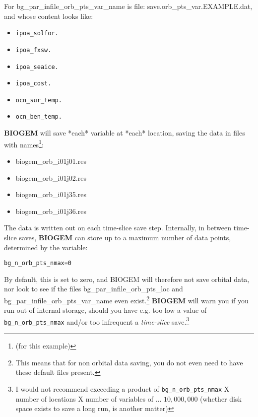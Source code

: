 \documentclass[11pt,fleqn]{book} %
\begin{document}
For \footnotesize\textsf{bg\_par\_infile\_orb\_pts\_var\_name }\normalsize  is file:  \footnotesize\textsf{save.orb\_pts\_var.EXAMPLE.dat}\normalsize, and whose content looks like:
\vspace{1mm}
\begin{itemize}[noitemsep]
\item[] \texttt{ipoa\_solfor.}
\item[] \texttt{ipoa\_fxsw.}
\item[] \texttt{ipoa\_seaice.}
\item[] \texttt{ipoa\_cost.}
\item[] \texttt{ocn\_sur\_temp.}
\item[] \texttt{ocn\_ben\_temp.}
\end{itemize}
\vspace{1mm}

\textbf{BIOGEM} will save *each* variable at *each* location, saving the data in files with names\footnote{(for this example)}:
\vspace{1mm}
\begin{itemize}[noitemsep]
\item[] \textsf{\footnotesize biogem\_orb\_i01j01.res}
\item[] \textsf{\footnotesize biogem\_orb\_i01j02.res}
\item[] \textsf{\footnotesize biogem\_orb\_i01j35.res}
\item[] \textsf{\footnotesize biogem\_orb\_i01j36.res}
\end{itemize}
\vspace{1mm}

The data is written out on each time-slice save step.
Internally, in between time-slice saves, \textbf{BIOGEM} can store up to a maximum number of data points, determined by the variable:
\begin{verbatim}
bg_n_orb_pts_nmax=0
\end{verbatim}
By default, this is set to zero, and BIOGEM will therefore not save orbital data, nor look to see if the files \textsf{\footnotesize bg\_par\_infile\_orb\_pts\_loc } and \textsf{\footnotesize bg\_par\_infile\_orb\_pts\_var\_name} even exist.\footnote{This means that for non orbital data saving, you do not even need to have these default files present.} \textbf{BIOGEM} will warn you if you run out of internal storage, should you have e.g. too low a value of \texttt{bg\_n\_orb\_pts\_nmax} and/or too infrequent a\textit{ time-slice} save.\footnote{I would not recommend exceeding a product of \texttt{bg\_n\_orb\_pts\_nmax} X number of locations X number of variables of ... \(10,000,000\) (whether disk space exists to save a long run, is another matter)}
\end{document}
